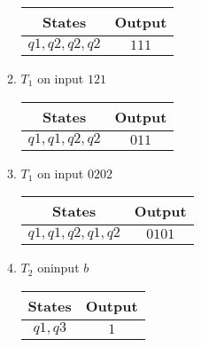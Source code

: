 \begin{enumerate}
\begin{enumerate}
\begin{table}[H]
                        \begin{tabular}{|c|c|}
                            \hline
                            States        & Output \\
                            \hline
                            $q1,q2,q2,q2$ & $111$  \\
                            \hline
                        \end{tabular}
                    \end{table}
              \item $T_1$ on input $121$
                    \begin{table}[H]
                        \centering
                        \begin{tabular}{|c|c|}
                            \hline
                            States        & Output \\
                            \hline
                            $q1,q1,q2,q2$ & $011$  \\
                            \hline
                        \end{tabular}
                    \end{table}
              \item $T_1$ on input $0202$
                    \begin{table}[H]
                        \centering
                        \begin{tabular}{|c|c|}
                            \hline
                            States           & Output \\
                            \hline
                            $q1,q1,q2,q1,q2$ & $0101$ \\
                            \hline
                        \end{tabular}
                    \end{table}
              \item $T_2$ oninput $b$
                    \begin{table}[H]
                        \centering
                        \begin{tabular}{|c|c|}
                            \hline
                            States  & Output \\
                            \hline
                            $q1,q3$ & $1$    \\
                            \hline
                        \end{tabular}

\end{table}
\end{enumerate}
\end{enumerate}
